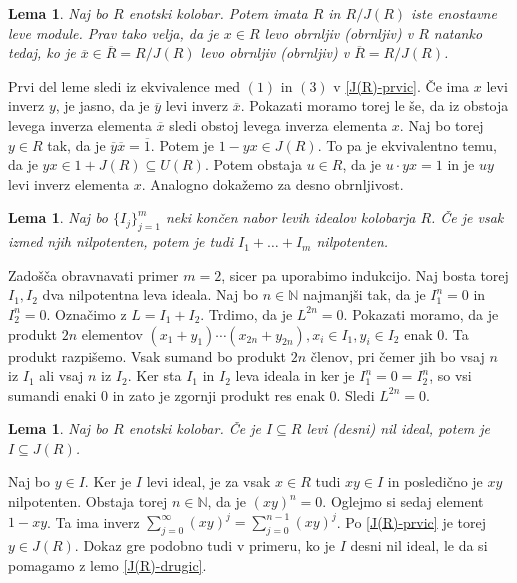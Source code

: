 \documentclass[a4paper, 12pt]{amsart}
\theoremstyle{definition} %
\theoremstyle{plain} %
\newtheorem{lema}[definicija]{Lema}
\newcommand{\N}{\mathbb N}
\begin{document}
\begin{lema}
\label{RinR/J(R)}
Naj bo $R$ enotski kolobar. Potem imata $R$ in $R/J(R)$ iste enostavne leve module. Prav tako velja, da je $x\in R$ levo obrnljiv (obrnljiv) v $R$ natanko tedaj, ko je $\overline{x} \in \overline{R} = R/J(R)$ levo obrnljiv (obrnljiv) v $\overline{R} = R/J(R)$.
\end{lema}

\proof
Prvi del leme sledi iz ekvivalence med $(1)$ in $(3)$ v \ref{J(R)-prvic}. Če ima $x$ levi inverz $y$, je jasno, da je $\overline{y}$ levi inverz $\overline{x}$. Pokazati moramo torej le še, da iz obstoja levega inverza elementa $\overline{x}$ sledi obstoj levega inverza  elementa $x$. Naj bo torej $y\in R$ tak, da je $\overline{y} \overline{x} = \overline{1}$. Potem je $1- yx \in J(R)$. To pa je ekvivalentno temu, da je $yx \in 1 + J(R) \subseteq U(R)$. Potem obstaja  $u\in R$, da je $u\cdot yx =1$ in je $uy $ levi inverz elementa $x$. Analogno dokažemo za desno obrnljivost.
\endproof

\begin{lema}
Naj bo $\{I_j\}_{j=1}^m$ neki končen nabor levih idealov kolobarja $R$. Če je vsak izmed njih nilpotenten, potem je tudi $I_1 + \dots + I_m$ nilpotenten.
\end{lema}

\proof
Zadošča obravnavati primer $m=2$, sicer pa uporabimo indukcijo. Naj bosta torej $I_1,I_2$ dva nilpotentna leva ideala. Naj bo $n\in \N$ najmanjši tak, da je $I_1^n = 0$ in $I_2^n = 0$. Označimo z $L=I_1 + I_2$. Trdimo, da je $L^{2n} = 0$. Pokazati moramo, da je produkt $2n$ elementov $(x_1 + y_1) \cdots (x_{2n} + y_{2n}), x_i \in I_1, y_i \in I_2$  enak 0. Ta produkt razpišemo. Vsak sumand bo produkt $2n$ členov, pri čemer jih bo vsaj $n$ iz $I_1$ ali vsaj $n$ iz $I_2$. Ker sta $I_1$ in $I_2$ leva ideala in ker je $I_1^n = 0 = I_2^n$, so vsi sumandi enaki 0 in zato je zgornji produkt res enak 0. Sledi $L^{2n} = 0$.
\endproof
 
\begin{lema}
\label{nilPodJ(R)}
Naj bo $R$ enotski kolobar. Če je $I\subseteq R$ levi (desni) nil ideal, potem je $I\subseteq J(R)$.
\end{lema}

\proof
Naj bo $y\in I$. Ker je $I$ levi ideal, je za vsak $x\in R$ tudi $xy \in I$ in posledično je $xy$ nilpotenten. Obstaja torej $n\in \N$, da je $(xy)^n = 0$. Oglejmo si sedaj element $1-xy$. Ta ima inverz $\sum_{j=0}^{\infty} (xy)^j = \sum_{j=0}^{n-1} (xy)^j$. Po \ref{J(R)-prvic} je torej $y \in J(R)$. Dokaz gre podobno tudi v primeru, ko je $I$ desni nil ideal, le da si pomagamo z lemo \ref{J(R)-drugic}.
\endproof
\end{document}
